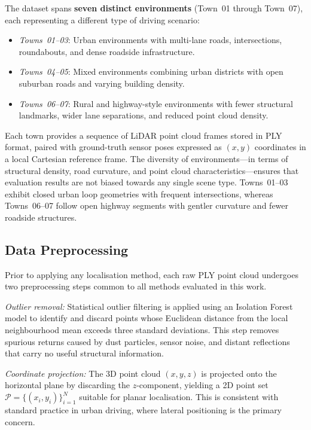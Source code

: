 \documentclass[lettersize,journal]{IEEEtran}
\begin{document}
The dataset spans \textbf{seven distinct environments} (Town~01 through Town~07),
each representing a different type of driving scenario:

\begin{itemize}
  \item \textit{Towns~01--03}: Urban environments with multi-lane roads,
    intersections, roundabouts, and dense roadside infrastructure.
  \item \textit{Towns~04--05}: Mixed environments combining urban districts
    with open suburban roads and varying building density.
  \item \textit{Towns~06--07}: Rural and highway-style environments with
    fewer structural landmarks, wider lane separations, and reduced point
    cloud density.
\end{itemize}

Each town provides a sequence of LiDAR point cloud frames stored in PLY format,
paired with ground-truth sensor poses expressed as $(x, y)$ coordinates in a
local Cartesian reference frame. The diversity of environments---in terms of
structural density, road curvature, and point cloud characteristics---ensures
that evaluation results are not biased towards any single scene type.
Towns~01--03 exhibit closed urban loop geometries with frequent intersections,
whereas Towns~06--07 follow open highway segments with gentler curvature and
fewer roadside structures.

\subsection{Data Preprocessing}

Prior to applying any localisation method, each raw PLY point cloud undergoes
two preprocessing steps common to all methods evaluated in this work.

\textit{Outlier removal:} Statistical outlier filtering is applied using an
Isolation Forest model to identify and discard points whose Euclidean distance
from the local neighbourhood mean exceeds three standard deviations. This step
removes spurious returns caused by dust particles, sensor noise, and distant
reflections that carry no useful structural information.

\textit{Coordinate projection:} The 3D point cloud $(x, y, z)$ is projected
onto the horizontal plane by discarding the $z$-component, yielding a 2D
point set $\mathcal{P} = \{(x_i, y_i)\}_{i=1}^{N}$ suitable for planar
localisation. This is consistent with standard practice in urban driving,
where lateral positioning is the primary concern.
\end{document}
